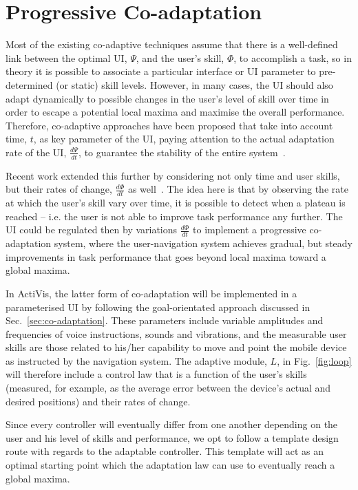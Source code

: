 \documentclass[format=sigconf, review=true, screen=true, anonymous=true]{acmart}
\begin{document}
\section{Progressive Co-adaptation}\label{sec:adaptation}

Most of the existing co-adaptive techniques assume that there is a well-defined link between the optimal UI, $\Psi$, and the user's skill, $\Phi$, to accomplish a task, so in theory it is possible to associate a particular interface or UI parameter to pre-determined (or static) skill levels. However, in many cases, the UI should also adapt dynamically to possible changes in the user's level of skill over time in order to escape a potential local maxima and maximise the overall performance. Therefore, co-adaptive approaches have been proposed that take into account time, $t$, as  key parameter of the UI, paying attention to the actual adaptation rate of the UI, $\frac{d\Psi}{dt}$, to guarantee the stability of the entire system~\cite{Merel2013}.

Recent work extended this further by considering not only time and user skills, but their rates of change, $\frac{d\Phi}{dt}$ as well~\cite{gallina2015}. The idea here is that by observing the rate at which the user's skill vary over time, it is possible to detect when a plateau is reached -- i.e. the user is not able to improve task performance any further. The UI could be regulated then by variations $\frac{d\Phi}{dt}$ to implement a progressive co-adaptation system, where the user-navigation system achieves gradual, but steady improvements in task performance that goes beyond local maxima toward a global maxima.

In ActiVis, the latter form of co-adaptation will be implemented in a parameterised UI by following the goal-orientated approach discussed in Sec.~\ref{sec:co-adaptation}. These parameters include variable amplitudes and frequencies of voice instructions, sounds and vibrations, and the measurable user skills are those related to his/her capability to move and point the mobile device as instructed by the navigation system. The adaptive module, $L$, in Fig.~\ref{fig:loop} will therefore include a control law that is a function of the user's skills (measured, for example, as the average error between the device's actual and desired positions) and their rates of change.

Since every controller will eventually differ from one another depending on the user and his level of skills and performance, we opt to follow a template design route with regards to the adaptable controller. This template will act as an optimal starting point which the adaptation law can use to eventually reach a global maxima. 
\end{document}
